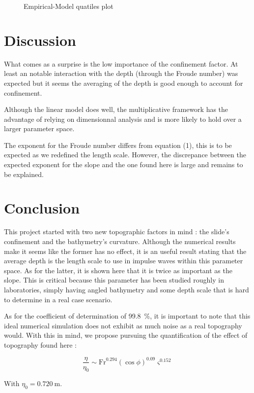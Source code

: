 \documentclass[a4paper,11pt]{article}
\begin{document}
\begin{figure}
\hypertarget{fig:qq}{%
\centering

\caption{Empirical-Model quatiles plot}\label{fig:qq}
}
\end{figure}

\hypertarget{discussion}{%
\section{Discussion}\label{discussion}}

What comes as a surprise is the low importance of the confinement
factor. At least an notable interaction with the depth (through the
Froude number) was expected but it seems the averaging of the depth is
good enough to account for confinement.

Although the linear model does well, the multiplicative framework has
the advantage of relying on dimensionnal analysis and is more likely to
hold over a larger parameter space.

The exponent for the Froude number differs from equation (1), this is to
be expected as we redefined the length scale. However, the discrepance
between the expected exponent for the slope and the one found here is
large and remains to be explained.

\hypertarget{conclusion}{%
\section{Conclusion}\label{conclusion}}

This project started with two new topographic factors in mind : the
slide's confinement and the bathymetry's curvature. Although the
numerical results make it seems like the former has no effect, it is an
useful result stating that the average depth is the length scale to use
in impulse waves within this parameter space. As for the latter, it is
shown here that it is twice as important as the slope. This is critical
because this parameter has been studied roughly in laboratories, simply
having angled bathymetry and some depth scale that is hard to determine
in a real case scenario.

As for the coefficient of determination of \SI{99.8}{\percent}, it is
important to note that this ideal numerical simulation does not exhibit
as much noise as a real topography would. With this in mind, we propose
pursuing the quantification of the effect of topography found here :

\[\frac{\eta}{\eta_0} \sim \mathrm{Fr}^{0.294} \left(\cos\phi\right)^{0.09} \varsigma^{0.152}\]

With \(\eta_0=\SI{0.720}{\meter}\).


\label{sec:bibliographie}
\thispagestyle{empty}
\end{document}
